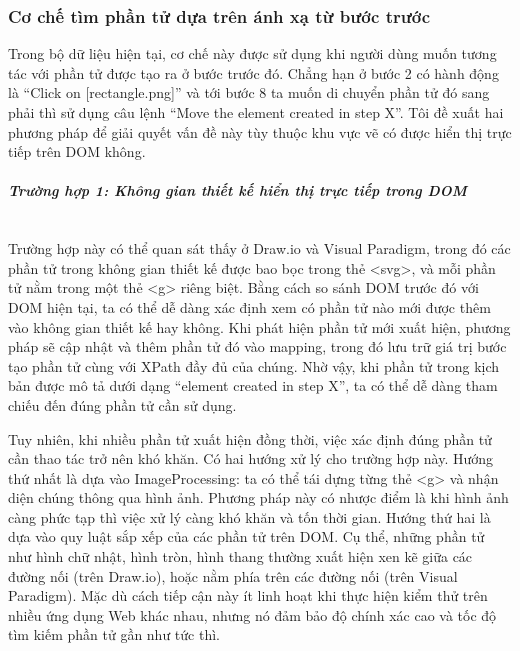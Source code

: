 \documentclass[a4paper, 12pt]{report}
\begin{document}
{\subsubsection{Cơ chế tìm phần tử dựa trên ánh xạ từ bước trước}
Trong bộ dữ liệu hiện tại, cơ chế này được sử dụng khi người dùng muốn tương tác với phần tử được tạo ra ở bước trước đó. Chẳng hạn ở bước 2 có hành động là ``Click on [rectangle.png]'' và tới bước 8 ta muốn di chuyển phần tử đó sang phải thì sử dụng câu lệnh ``Move the element created in step X''. Tôi đề xuất hai phương pháp để giải quyết vấn đề này tùy thuộc khu vực vẽ có được hiển thị trực tiếp trên DOM không. \mbox{}\\[-2.5em]

\paragraph{\hspace*{1.2em}\textit{Trường hợp 1: Không gian thiết kế hiển thị trực tiếp trong DOM}} \mbox{}\\[-1.5em]

Trường hợp này có thể quan sát thấy ở Draw.io và Visual Paradigm, trong đó các phần tử trong không gian thiết kế được bao bọc trong thẻ <svg>, và mỗi phần tử nằm trong một thẻ <g> riêng biệt. Bằng cách so sánh DOM trước đó với DOM hiện tại, ta có thể dễ dàng xác định xem có phần tử nào mới được thêm vào không gian thiết kế hay không. Khi phát hiện phần tử mới xuất hiện, phương pháp sẽ cập nhật và thêm phần tử đó vào mapping, trong đó lưu trữ giá trị bước tạo phần tử cùng với XPath đầy đủ của chúng. Nhờ vậy, khi phần tử trong kịch bản được mô tả dưới dạng ``element created in step X'', ta có thể dễ dàng tham chiếu đến đúng phần tử cần sử dụng.


Tuy nhiên, khi nhiều phần tử xuất hiện đồng thời, việc xác định đúng phần tử cần thao tác trở nên khó khăn. Có hai hướng xử lý cho trường hợp này. Hướng thứ nhất là dựa vào \gls{ImageProcessing}: ta có thể tái dựng từng thẻ <g> và nhận diện chúng thông qua hình ảnh. Phương pháp này có nhược điểm là khi hình ảnh càng phức tạp thì việc xử lý càng khó khăn và tốn thời gian. Hướng thứ hai là dựa vào quy luật sắp xếp của các phần tử trên DOM. Cụ thể, những phần tử như hình chữ nhật, hình tròn, hình thang thường xuất hiện xen kẽ giữa các đường nối (trên Draw.io), hoặc nằm phía trên các đường nối (trên Visual Paradigm). Mặc dù cách tiếp cận này ít linh hoạt khi thực hiện kiểm thử trên nhiều ứng dụng Web khác nhau, nhưng nó đảm bảo độ chính xác cao và tốc độ tìm kiếm phần tử gần như tức thì.\mbox{}\\[-2.5em]



}
\end{document}
